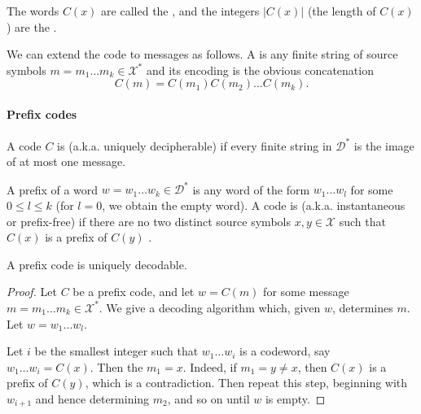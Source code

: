 The words $C(x)$ are called the , and the integers $|C(x)|$ (the length of $C(x)$) are the .


We can extend the code to messages as follows. A  is any finite string of source symbols $m = m_1 \dots m_k \in \mathcal{X}^*$ and its encoding is the obvious concatenation 
\[
    C(m) = C(m_1) C(m_2) \dots C(m_k).
\]



\paragraph{Prefix codes}


A code $C$ is  (a.k.a. uniquely decipherable) if every finite string in $\mathcal{D}^*$ is the image of at most one message. 

A prefix of a word $w = w_1 \dots w_k \in \mathcal{D}^*$ is any word of the form $w_1 \dots w_l$ for some $0 \le l \le k$ (for $l=0$, we obtain the empty word). A code is  (a.k.a. instantaneous or prefix-free) if there are no two distinct source symbols $x, y \in \mathcal{X}$ such that $C(x)$ is a prefix of  $C(y)$         .

\begin{theorem}
A prefix code is uniquely decodable.
\end{theorem}

\begin{proof}
Let $C$ be a prefix code, and let $w = C(m)$ for some message $m = m_1 \dots m_k \in \mathcal{X}^*$. We give a decoding algorithm which, given $w$, determines $m$. Let $w = w_1 \dots w_l$.

Let $i$ be the smallest integer such that $w_1 \dots w_i$ is a codeword, say $w_1 \dots w_i = C(x)$. Then the $m_1 = x$. Indeed, if $m_1 = y \ne x$, then $C(x)$ is a prefix of $C(y)$, which is a contradiction. Then repeat this step, beginning with $w_{i+1}$ and hence determining $m_2$, and so on until $w$ is empty.
\end{proof}

